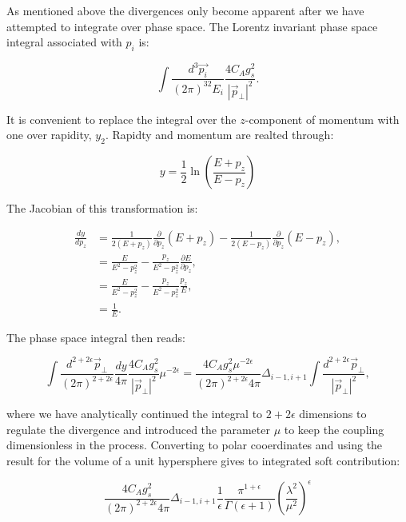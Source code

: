 			As mentioned above the divergences only become apparent after we have attempted to integrate over phase space.  The Lorentz invariant phase space integral associated with $p_i$ is:

			\begin{equation}
			\int\frac{d^3\vec{p_i}}{(2\pi)^32E_i}\frac{4C_Ag_s^2}{|\vec{p}_\perp|^2}.
			\end{equation}

			It is convenient to replace the integral over the $z$-component of momentum with one over rapidity, $y_2$.  Rapidty and momentum are realted through:

			\begin{equation}
			y = \frac12\ln\left(\frac{E + p_z}{E - p_z}\right)
			\end{equation}

			The Jacobian of this transformation is:

			\begin{align}
			\frac{dy}{dp_z} &= \frac{1}{2(E+p_z)} \frac{\partial}{\partial p_z}(E+p_z) - \frac{1}{2(E-p_z)}\frac{\partial}{\partial p_z}(E-p_z),\\
			&= \frac{E}{E^2-p_z^2} - \frac{p_z}{E^2-p_z^2}\frac{\partial E}{\partial p_z},\\
			&= \frac{E}{E^2-p_z^2} - \frac{p_z}{E^2-p_z^2}\frac{p_z}{E},\\
			&= \frac{1}{E}.
			\end{align}

			The phase space integral then reads:

			\begin{equation}
			\int\frac{d^{2+2\epsilon}\vec{p}_{\perp}}{(2\pi)^{2+2\epsilon}}\frac{dy}{4\pi}\frac{4C_Ag_s^2}{|\vec{p}_\perp|^2}\mu^{-2\epsilon} = \frac{4C_Ag_s^2\mu^{-2\epsilon}}{(2\pi)^{2+2\epsilon}4\pi}\Delta_{i-1, i+1}\int\frac{d^{2+2\epsilon}\vec{p}_{\perp}}{|\vec{p}_\perp|^2},
			\end{equation}

			where we have analytically continued the integral to $2+2\epsilon$ dimensions to regulate the divergence and introduced the parameter $\mu$ to keep the coupling dimensionless in the process.  Converting to polar cooerdinates and using the result for the volume of a unit hypersphere gives to integrated soft contribution:

			\begin{equation}
			\frac{4C_Ag_s^2}{(2\pi)^{2+2\epsilon}4\pi}\Delta_{i-1, i+1}\frac{1}{\epsilon}\frac{\pi^{1+\epsilon}}{\Gamma(\epsilon+1)}\left(\frac{\lambda^2}{\mu^2}\right)^\epsilon
			\label{eqn:soft}
			\end{equation}

